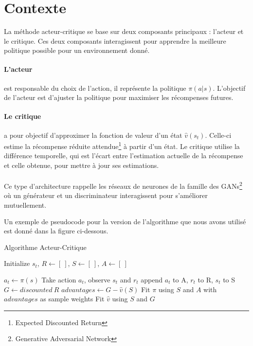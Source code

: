 \section{Contexte}

\paragraph{}
La méthode acteur-critique se base sur deux composants principaux : l'acteur et le critique. 
Ces deux composants interagissent pour apprendre la meilleure politique possible pour un environnement donné.

\paragraph{L'acteur} est responsable du choix de l'action, il représente la politique $\pi(a|s)$. 
L'objectif de l'acteur est d'ajuster la politique pour maximiser les récompenses futures.

\paragraph{Le critique} a pour objectif d'approximer la fonction de valeur d'un état $\hat{v}(s_t)$. 
Celle-ci estime la récompense réduite attendue\footnote{Expected Discounted Return} à partir d'un état.
Le critique utilise la différence temporelle, 
qui est l'écart entre l'estimation actuelle de la récompense et celle obtenue, pour mettre à jour ses estimations.

\paragraph{}
Ce type d'architecture rappelle les réseaux de neurones de la famille des GANs\footnote{Generative Adversarial Network} 
où un générateur et un discriminateur interagissent pour s'améliorer mutuellement.

Un exemple de pseudocode pour la version de l'algorithme que nous avons utilisé est donné dans la figure ci-dessous.
\begin{algorithm}
\caption{Algorithme Acteur-Critique}\label{alg:a2c}
\begin{algorithmic}

\State Initialize $s_t$, $R \gets [~]$, $S \gets [~]$, $A \gets [~]$

\State $a_t \gets \pi(s)$ 
\State Take action $a_t$, observe $s_t$ and $r_t$
\State append $a_t$ to A, $r_t$ to R, $s_t$ to S
\State $G \gets discounted~R$
\State $advantages \gets G - \hat{v}(S)$
\State Fit $\pi$ using \(S\) and \(A\) with $advantages$ as sample weights
\State Fit $\hat{v}$ using \(S\) and \(G\)
\EndIf
\EndFor
\EndFor
\end{algorithmic}
\end{algorithm}

